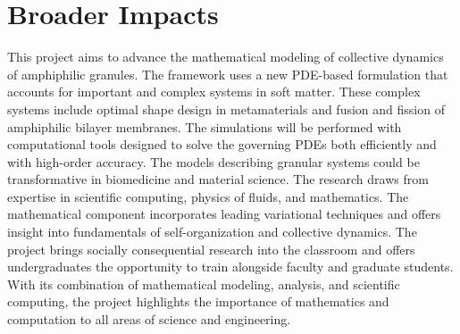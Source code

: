 \section{Broader Impacts}
\label{sec:BroaderImpacts}
This project aims to advance the mathematical modeling of collective
dynamics of amphiphilic granules. The framework uses a new PDE-based
formulation that accounts for important and complex systems in soft
matter. These complex systems include optimal shape design in
metamaterials and fusion and fission of amphiphilic bilayer membranes.
The simulations will be performed with computational tools designed to
solve the governing PDEs both efficiently and with high-order accuracy.
The models describing granular systems could be transformative in
biomedicine and material science. The research draws from expertise in
scientific computing, physics of fluids, and mathematics. The
mathematical component incorporates leading variational techniques and
offers insight into fundamentals of self-organization and collective
dynamics. The project brings socially consequential research into the
classroom and offers undergraduates the opportunity to train alongside
faculty and graduate students. With its combination of mathematical
modeling, analysis, and scientific computing, the project highlights the
importance of mathematics and computation to all areas of science and
engineering.


